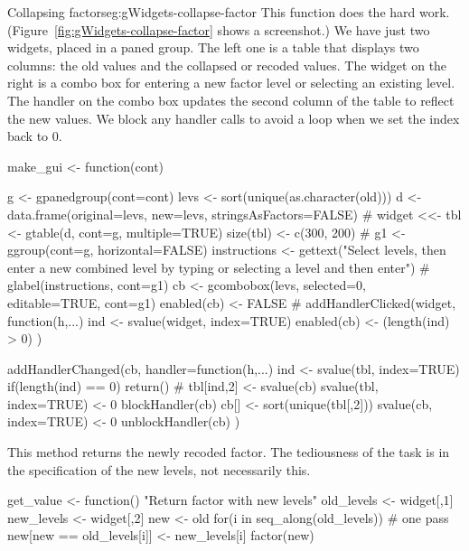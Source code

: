 \begin{example}{Collapsing factors}{eg:gWidgets-collapse-factor}
This  function does the hard
work. (Figure~\ref{fig:gWidgets-collapse-factor} shows a screenshot.)
We have just two widgets, placed in a paned group. The left one is a
table that displays two columns: the old values and the collapsed or
recoded values. The widget on the right is a combo box for entering a
new factor level or selecting an existing level. The handler on the
combo box updates the second column of the table to reflect the new
values. We block any handler calls to avoid a loop when we set the
index back to 0.
\begin{Schunk}
\begin{Sinput}
 make_gui <- function(cont) {
   g <- gpanedgroup(cont=cont)
   levs <- sort(unique(as.character(old)))
   d <- data.frame(original=levs,
                   new=levs, stringsAsFactors=FALSE)
   #
   widget <<- tbl <- gtable(d, cont=g,  multiple=TRUE)
   size(tbl) <- c(300, 200)
   #
   g1 <- ggroup(cont=g, horizontal=FALSE)
   instructions <- gettext("Select levels, then\n 
 enter a new combined level\n
 by typing or selecting a level and then enter")
   #
   glabel(instructions, cont=g1)
   cb <- gcombobox(levs, selected=0, editable=TRUE, cont=g1)
   enabled(cb) <- FALSE
   #
   addHandlerClicked(widget, function(h,...) {
     ind <- svalue(widget, index=TRUE)
     enabled(cb) <- (length(ind) > 0)
   })
   
   addHandlerChanged(cb, handler=function(h,...) {
     ind <- svalue(tbl, index=TRUE)
     if(length(ind) == 0) 
       return()
     #
     tbl[ind,2] <- svalue(cb)
     svalue(tbl, index=TRUE) <- 0
     blockHandler(cb)
     cb[] <- sort(unique(tbl[,2]))
     svalue(cb, index=TRUE) <- 0
     unblockHandler(cb)
   })
 }
\end{Sinput}
\end{Schunk}

This method returns the newly recoded factor. The tediousness of the task
is in the specification of the new levels, not necessarily this. 
\begin{Schunk}
\begin{Sinput}
 get_value <- function() {
   "Return factor with new levels"
   old_levels <- widget[,1]
   new_levels <- widget[,2]
   new <- old
   for(i in seq_along(old_levels)) # one pass
     new[new == old_levels[i]] <- new_levels[i]
   factor(new)
 }
\end{Sinput}
\end{Schunk}
%


\end{example}
